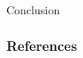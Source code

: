 \documentclass[xcolor=dvipsnames]{beamer}
\begin{document}
\begin{frame}[c]
  \begin{block}{}
  \begin{center}
    \huge{Conclusion}
  \end{center}
  \end{block}
\end{frame}


\begin{frame}
  \frametitle{References}
  
  \footnotesize{
    
  }
\end{frame}
\end{document}
